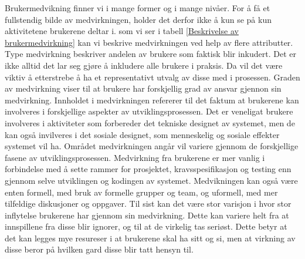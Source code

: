 \noindent
Brukermedvikning finner vi i mange former og i mange nivåer. For å få et fullstendig bilde av medvirkningen, holder det derfor ikke å kun se på kun aktivitetene brukerene deltar i. som vi ser i tabell \ref{Beskrivelse av brukermedvirkning} kan vi beskrive medvirkningen ved help av flere attributter. Type medvirkning beskriver andelen av brukere som faktisk blir inkudert. Det er ikke alltid det lar seg gjøre å inkludere alle brukere i praksis. Da vil det være viktiv å etterstrebe å ha et representativt utvalg av disse med i prosessen. Graden av medvirkning viser til at brukere har forskjellig grad av ansvar gjennon sin medvirkning. Innholdet i medvirkningen refererer til det faktum at brukerene kan involveres i forskjellige aspekter av utviklingsprosessen. Det er veneligat brukere involveres i aktiviteter som forbereder det tekniske designet av systemet, men de kan også invilveres i det sosiale designet, som menneskelig og sosiale effekter systemet vil ha. Området medvirkningen angår vil variere gjennom de forskjellige fasene av utviklingsprosessen. Medvirkning fra brukerene er mer vanlig i forbindelse med å sette rammer for prosjektet, kravsspesifikasjon og testing enn gjennom selve utviklingen og kodingen av systemet. Medvikningen kan også være enten formell, med bruk av formelle grupper og team, og uformell, med mer tilfeldige diskusjoner og oppgaver. Til sist kan det være stor varisjon i hvor stor inflytelse brukerene har gjennom sin medvirkning. Dette kan variere helt fra at innspillene fra disse blir ignorer, og til at de virkelig tas seriøst. Dette betyr at det kan legges mye resureser i at brukerene skal ha sitt og si, men at virkning av disse beror på hvilken gard disse blir tatt hensyn til.

